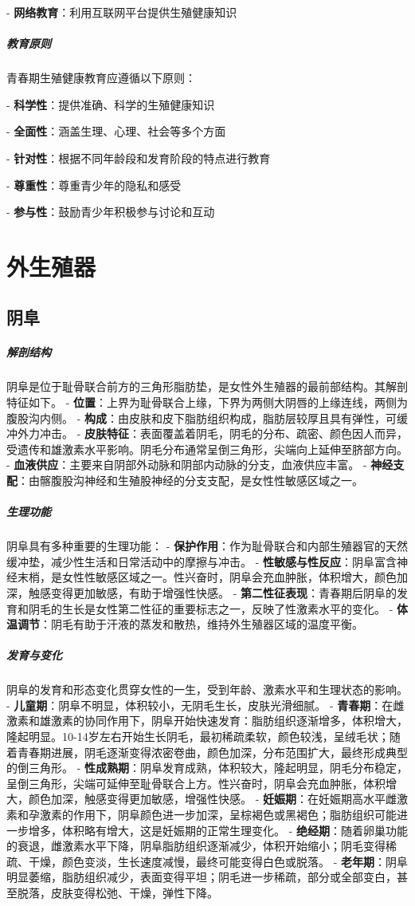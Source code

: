 \begin{enumerate}
- \textbf{网络教育}：利用互联网平台提供生殖健康知识

\subparagraph{教育原则}

青春期生殖健康教育应遵循以下原则：

- \textbf{科学性}：提供准确、科学的生殖健康知识

- \textbf{全面性}：涵盖生理、心理、社会等多个方面

- \textbf{针对性}：根据不同年龄段和发育阶段的特点进行教育

- \textbf{尊重性}：尊重青少年的隐私和感受

- \textbf{参与性}：鼓励青少年积极参与讨论和互动

\section{外生殖器}

\subsection{阴阜}

\subparagraph{解剖结构}
阴阜是位于耻骨联合前方的三角形脂肪垫，是女性外生殖器的最前部结构。其解剖特征如下。
- \textbf{位置}：上界为耻骨联合上缘，下界为两侧大阴唇的上缘连线，两侧为腹股沟内侧。
- \textbf{构成}：由皮肤和皮下脂肪组织构成，脂肪层较厚且具有弹性，可缓冲外力冲击。
- \textbf{皮肤特征}：表面覆盖着阴毛，阴毛的分布、疏密、颜色因人而异，受遗传和雄激素水平影响。阴毛分布通常呈倒三角形，尖端向上延伸至脐部方向。
- \textbf{血液供应}：主要来自阴部外动脉和阴部内动脉的分支，血液供应丰富。
- \textbf{神经支配}：由髂腹股沟神经和生殖股神经的分支支配，是女性性敏感区域之一。

\subparagraph{生理功能}
阴阜具有多种重要的生理功能：
- \textbf{保护作用}：作为耻骨联合和内部生殖器官的天然缓冲垫，减少性生活和日常活动中的摩擦与冲击。
- \textbf{性敏感与性反应}：阴阜富含神经末梢，是女性性敏感区域之一。性兴奋时，阴阜会充血肿胀，体积增大，颜色加深，触感变得更加敏感，有助于增强性快感。
- \textbf{第二性征表现}：青春期后阴阜的发育和阴毛的生长是女性第二性征的重要标志之一，反映了性激素水平的变化。
- \textbf{体温调节}：阴毛有助于汗液的蒸发和散热，维持外生殖器区域的温度平衡。

\subparagraph{发育与变化}
阴阜的发育和形态变化贯穿女性的一生，受到年龄、激素水平和生理状态的影响。
- \textbf{儿童期}：阴阜不明显，体积较小，无阴毛生长，皮肤光滑细腻。
- \textbf{青春期}：在雌激素和雄激素的协同作用下，阴阜开始快速发育：脂肪组织逐渐增多，体积增大，隆起明显。10-14岁左右开始生长阴毛，最初稀疏柔软，颜色较浅，呈绒毛状；随着青春期进展，阴毛逐渐变得浓密卷曲，颜色加深，分布范围扩大，最终形成典型的倒三角形。
- \textbf{性成熟期}：阴阜发育成熟，体积较大，隆起明显，阴毛分布稳定，呈倒三角形，尖端可延伸至耻骨联合上方。性兴奋时，阴阜会充血肿胀，体积增大，颜色加深，触感变得更加敏感，增强性快感。
- \textbf{妊娠期}：在妊娠期高水平雌激素和孕激素的作用下，阴阜颜色进一步加深，呈棕褐色或黑褐色；脂肪组织可能进一步增多，体积略有增大，这是妊娠期的正常生理变化。
- \textbf{绝经期}：随着卵巢功能的衰退，雌激素水平下降，阴阜脂肪组织逐渐减少，体积开始缩小；阴毛变得稀疏、干燥，颜色变淡，生长速度减慢，最终可能变得白色或脱落。
- \textbf{老年期}：阴阜明显萎缩，脂肪组织减少，表面变得平坦；阴毛进一步稀疏，部分或全部变白，甚至脱落，皮肤变得松弛、干燥，弹性下降。


\end{enumerate}
